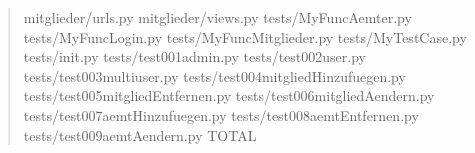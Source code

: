 \documentclass[letterpaper,10pt,english]{sphinxmanual}
\begin{document}
\begin{quote}
\begin{sphinxVerbatim}[commandchars=\\\{\}]
mitglieder/urls.py                                                     \PYGZpc{}
mitglieder/views.py                                                  \PYGZpc{}
tests/MyFuncAemter.py                                                  \PYGZpc{}
tests/MyFuncLogin.py                                                   \PYGZpc{}
tests/MyFuncMitglieder.py                                            \PYGZpc{}
tests/MyTestCase.py                                                    \PYGZpc{}
tests/\PYGZus{}\PYGZus{}init\PYGZus{}\PYGZus{}.py                                                      \PYGZpc{}
tests/test\PYGZus{}001\PYGZus{}admin.py                                                \PYGZpc{}
tests/test\PYGZus{}002\PYGZus{}user.py                                                 \PYGZpc{}
tests/test\PYGZus{}003\PYGZus{}multiuser.py                                            \PYGZpc{}
tests/test\PYGZus{}004\PYGZus{}mitgliedHinzufuegen.py                                  \PYGZpc{}
tests/test\PYGZus{}005\PYGZus{}mitgliedEntfernen.py                                   \PYGZpc{}
tests/test\PYGZus{}006\PYGZus{}mitgliedAendern.py                                     \PYGZpc{}
tests/test\PYGZus{}007\PYGZus{}aemtHinzufuegen.py                                     \PYGZpc{}
tests/test\PYGZus{}008\PYGZus{}aemtEntfernen.py                                       \PYGZpc{}
tests/test\PYGZus{}009\PYGZus{}aemtAendern.py                                         \PYGZpc{}
\PYGZhy{}\PYGZhy{}\PYGZhy{}\PYGZhy{}\PYGZhy{}\PYGZhy{}\PYGZhy{}\PYGZhy{}\PYGZhy{}\PYGZhy{}\PYGZhy{}\PYGZhy{}\PYGZhy{}\PYGZhy{}\PYGZhy{}\PYGZhy{}\PYGZhy{}\PYGZhy{}\PYGZhy{}\PYGZhy{}\PYGZhy{}\PYGZhy{}\PYGZhy{}\PYGZhy{}\PYGZhy{}\PYGZhy{}\PYGZhy{}\PYGZhy{}\PYGZhy{}\PYGZhy{}\PYGZhy{}\PYGZhy{}\PYGZhy{}\PYGZhy{}\PYGZhy{}\PYGZhy{}\PYGZhy{}\PYGZhy{}\PYGZhy{}\PYGZhy{}\PYGZhy{}\PYGZhy{}\PYGZhy{}\PYGZhy{}\PYGZhy{}\PYGZhy{}\PYGZhy{}\PYGZhy{}\PYGZhy{}\PYGZhy{}\PYGZhy{}\PYGZhy{}\PYGZhy{}\PYGZhy{}\PYGZhy{}\PYGZhy{}\PYGZhy{}\PYGZhy{}\PYGZhy{}\PYGZhy{}\PYGZhy{}\PYGZhy{}\PYGZhy{}\PYGZhy{}\PYGZhy{}\PYGZhy{}\PYGZhy{}\PYGZhy{}\PYGZhy{}\PYGZhy{}\PYGZhy{}\PYGZhy{}\PYGZhy{}\PYGZhy{}\PYGZhy{}\PYGZhy{}\PYGZhy{}
TOTAL                                                              \PYGZpc{}
\end{sphinxVerbatim}
\end{quote}
\end{document}
